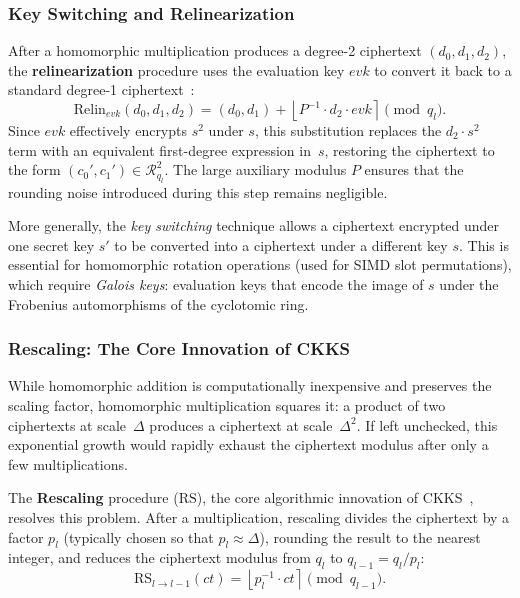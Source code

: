 \subsubsection{Key Switching and Relinearization}

After a homomorphic multiplication produces a degree-2 ciphertext $(d_0, d_1, d_2)$, the \textbf{relinearization} procedure uses the evaluation key $\mathit{evk}$ to convert it back to a standard degree-1 ciphertext~\cite{cheon2017homomorphic}:
\begin{equation}
    \mathrm{Relin}_{\mathit{evk}}(d_0, d_1, d_2) = (d_0, d_1) + \left\lfloor P^{-1} \cdot d_2 \cdot \mathit{evk} \right\rceil \pmod{q_l}.
    \label{eq:ckks_relin}
\end{equation}
Since $\mathit{evk}$ effectively encrypts $s^2$ under $s$, this substitution replaces the $d_2 \cdot s^2$ term with an equivalent first-degree expression in~$s$, restoring the ciphertext to the form $(c_0', c_1') \in \mathcal{R}_{q_l}^2$. The large auxiliary modulus $P$ ensures that the rounding noise introduced during this step remains negligible.

More generally, the \emph{key switching} technique allows a ciphertext encrypted under one secret key $s'$ to be converted into a ciphertext under a different key $s$. This is essential for homomorphic rotation operations (used for SIMD slot permutations), which require \emph{Galois keys}: evaluation keys that encode the image of $s$ under the Frobenius automorphisms of the cyclotomic ring.

\subsubsection{Rescaling: The Core Innovation of CKKS}
\label{sec:rescaling}

While homomorphic addition is computationally inexpensive and preserves the scaling factor, homomorphic multiplication squares it: a product of two ciphertexts at scale~$\Delta$ produces a ciphertext at scale~$\Delta^2$. If left unchecked, this exponential growth would rapidly exhaust the ciphertext modulus after only a few multiplications.

The \textbf{Rescaling} procedure ($\mathrm{RS}$), the core algorithmic innovation of CKKS~\cite{cheon2017homomorphic}, resolves this problem. After a multiplication, rescaling divides the ciphertext by a factor $p_l$ (typically chosen so that $p_l \approx \Delta$), rounding the result to the nearest integer, and reduces the ciphertext modulus from $q_l$ to $q_{l-1} = q_l / p_l$:
\begin{equation}
    \mathrm{RS}_{l \to l-1}(\mathit{ct}) = \left\lfloor p_l^{-1} \cdot \mathit{ct} \right\rceil \pmod{q_{l-1}}.
    \label{eq:ckks_rescale}
\end{equation}


